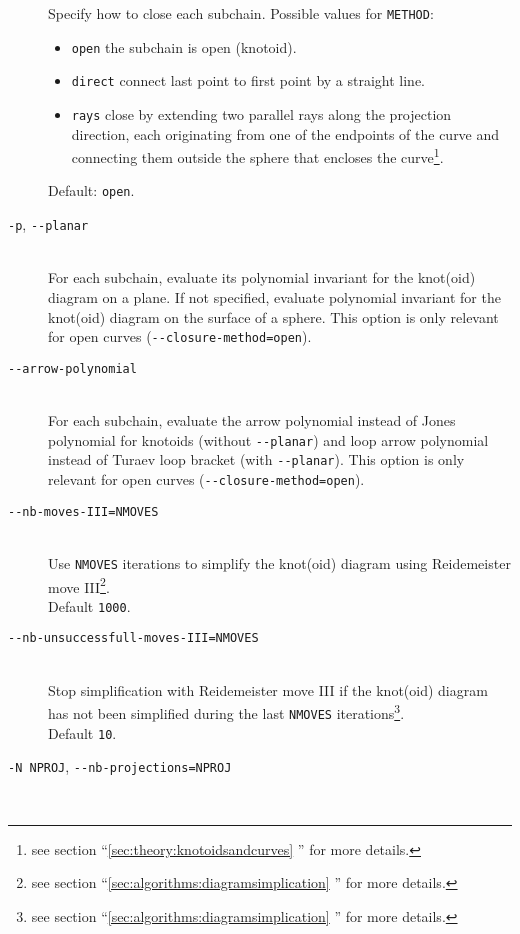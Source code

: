 \begin{description}
  Specify how to close each subchain. Possible values for \lstinline{METHOD}:
  \begin{itemize}
  \item \lstinline{open} the subchain is open (knotoid).
  \item \lstinline{direct} connect last point to first point by a straight line.
  \item \lstinline{rays} close by extending two parallel rays along the projection direction, each originating from one of the endpoints of the curve and connecting them outside the sphere that encloses the curve\footnote{see section ``\ref{sec:theory:knotoidsandcurves} '' for more details.}.
  \end{itemize}
  Default: \lstinline{open}.
\item[\lstinline{-p}, \lstinline{--planar}]\hfill\\
  For each subchain, evaluate its polynomial invariant for the knot(oid) diagram on a plane. If not specified, evaluate polynomial invariant for the knot(oid) diagram on the surface of a sphere. This option is only relevant for open curves (\lstinline{--closure-method=open}).
\item[\lstinline{--arrow-polynomial}]\hfill\\
  For each subchain, evaluate the arrow polynomial instead of Jones polynomial for knotoids (without \lstinline{--planar}) and loop arrow polynomial instead of Turaev loop bracket (with \lstinline{--planar}). This option is only relevant for open curves (\lstinline{--closure-method=open}).
\item[\lstinline{--nb-moves-III=NMOVES}]\hfill\\
  Use \lstinline{NMOVES} iterations to simplify the knot(oid) diagram using Reidemeister move III\footnote{see section  ``\ref{sec:algorithms:diagramsimplication} '' for more details.}.\\
  Default \lstinline{1000}.
\item[\lstinline{--nb-unsuccessfull-moves-III=NMOVES}]\hfill\\
  Stop simplification with Reidemeister move III if the knot(oid) diagram has not been simplified during the last \lstinline{NMOVES} iterations\footnote{see section  ``\ref{sec:algorithms:diagramsimplication} '' for more details.}.\\
  Default \lstinline{10}.
\item[\lstinline{-N NPROJ}, \lstinline{--nb-projections=NPROJ}]\hfill\\

\end{description}
